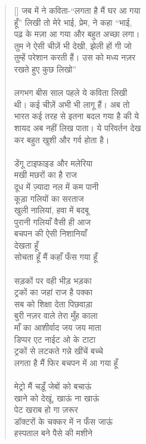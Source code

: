 \begin{verse}[\versewidth]\texthindi{
जब में ने कविता-“लगता है मैं घर आ गया\\
हूँ” लिखी तो मेरे भाई, प्रेम, ने कहा “भाई, \\
पढ़ के मज़ा आ गया और बहुत अच्छा लगा। \\
तुम ने ऐसी चीज़ें भी देखी, झेली हों गी जो\\
तुम्हें परेशान करती हैं। उस को मध्य नज़र\\
रखते हुए कुछ लिखो”\\
\\
लगभग बीस साल पहले ये कविता लिखी\\
थी। कई चीज़ें अभी भी लागू हैं। अब तो\\
भारत कई तरह से इतना बदल गया है की ये\\
शायद अब नहीं लिख पाता। ये परिवर्तन देख\\
कर बहुत खुशी और गर्व होता है।\\
\\
डेंगू टाइफाइड और मलेरिया\\
मखी मछरों का है राज\\
दूध में ज़्यादा नल में कम पानी\\
कूड़ा गलियों का सरताज\\
खुली नालियां, हवा में बदबू\\
पुरानी गलियाँ वैसी ही आज\\
बचपन की ऐसी निशानियाँ\\
देखता हूँ\\
सोचता हूँ मैं कहाँ फँस गया हूँ\\
\\
सड़कों पर वही भीड़ भड़का\\
ट्रकों का जहां राज है पक्का\\
सब को शिक्षा देता पिछवाड़ा\\
बुरी नज़र वाले तेरा मुँह काला\\
माँ का आशीर्वाद जय जय माता\\
डिप्पर एट नाईट ओ के टाटा\\
ट्रकों से लटकते गन्ने खींचें बच्चे\\
लगता है मैं फिर बचपन में आ गया हूँ\\
\\
मेट्रो मैं चड़ूँ जेबों को बचाऊं\\
खाने को देखूं, खाऊं ना खाऊं\\
पेट खराब हो गा ज़रूर\\
डॉक्टरों के चक्कर में न फँस जाऊं\\
हस्पताल बने पैसे की मशीने\\
}
\end{verse}
